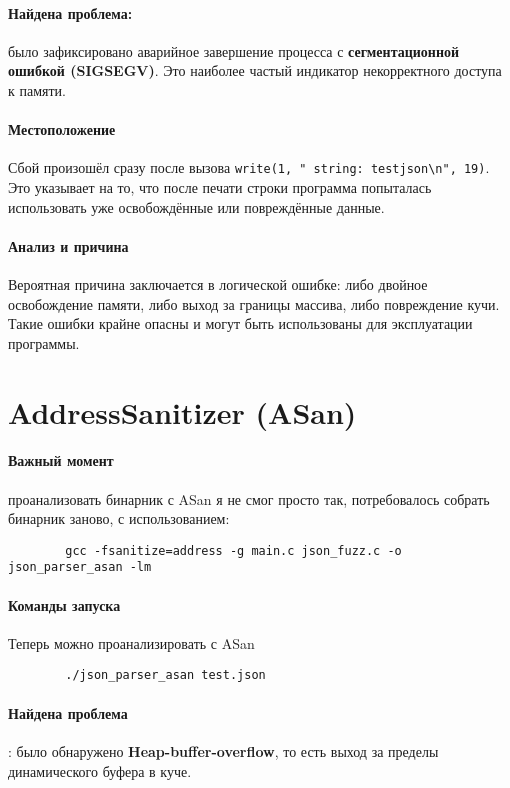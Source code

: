    \paragraph{Найдена проблема:}
    было зафиксировано аварийное завершение процесса с \textbf{сегментационной ошибкой (SIGSEGV)}.
    Это наиболее частый индикатор некорректного доступа к памяти.

    \paragraph{Местоположение} Сбой произошёл сразу после вызова \texttt{write(1, " string: testjson\textbackslash n", 19)}.
    Это указывает на то, что после печати строки программа попыталась использовать уже освобождённые или повреждённые данные.

    \paragraph{Анализ и причина} Вероятная причина заключается в логической ошибке: либо двойное освобождение памяти, либо выход за границы массива, либо повреждение кучи.
    Такие ошибки крайне опасны и могут быть использованы для эксплуатации программы.


    \section{AddressSanitizer (ASan)}

    \paragraph{Важный момент} проанализовать бинарник с ASan я не смог просто так, потребовалось собрать бинарник заново, с использованием:
    \begin{verbatim}
        gcc -fsanitize=address -g main.c json_fuzz.c -o json_parser_asan -lm
    \end{verbatim}

    \paragraph{Команды запуска} Теперь можно проанализировать с ASan
    \begin{verbatim}
        ./json_parser_asan test.json
    \end{verbatim}

    \paragraph{Найдена проблема}: было обнаружено \textbf{Heap-buffer-overflow}, то есть выход за пределы динамического буфера в куче.

